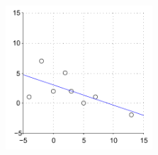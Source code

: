 \documentclass{tufte-handout}
\begin{document}
\begin{fullwidth}
\begin{description}
\begin{figure}[h]
  \includegraphics[width=155pt]{handout8_example}%
  \label{fig:fullfig}%
\end{figure}


\end{description}

\end{fullwidth}
\end{document}
